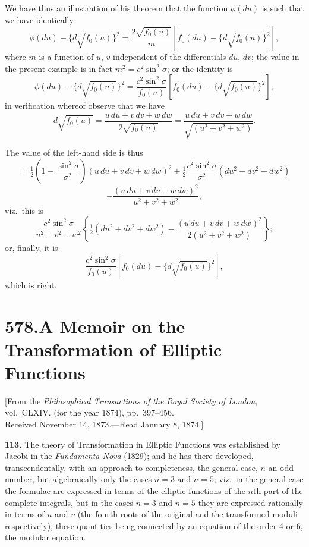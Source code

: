 \documentclass[11pt,a4paper]{book}
\begin{document}
We have thus an illustration of his theorem that the function $\phi(du)$ is such that we have identically
\[
\phi(du) - \{d\sqrt{f_0(u)}\}^2 = \frac{2\sqrt{f_0(u)}}{m}\left[f_0(du) - \{d\sqrt{f_0(u)}\}^2\right],
\]
where $m$ is a function of $u$, $v$ independent of the differentials $du$, $dv$; the value in the present example is in fact $m^2 = c^2\sin^2\sigma$; or the identity is
\[
\phi(du) - \{d\sqrt{f_0(u)}\}^2 = \frac{c^2\sin^2\sigma}{f_0(u)}\left[f_0(du) - \{d\sqrt{f_0(u)}\}^2\right],
\]
in verification whereof observe that we have
\[
d\sqrt{f_0(u)} = \frac{u\,du + v\,dv + w\,dw}{2\sqrt{f_0(u)}} = \frac{u\,du + v\,dv + w\,dw}{\sqrt{(u^2 + v^2 + w^2)}}.
\]

The value of the left-hand side is thus
\[
= \tfrac{1}{2}\left(1 - \frac{\sin^2\sigma}{\sigma^2}\right)(u\,du + v\,dv + w\,dw)^2 + \tfrac{1}{2}\frac{c^2\sin^2\sigma}{\sigma^2}(du^2 + dv^2 + dw^2)
\]
\[
- \frac{(u\,du + v\,dv + w\,dw)^2}{u^2 + v^2 + w^2},
\]
viz.\ this is
\[
\frac{c^2\sin^2\sigma}{u^2 + v^2 + w^2}\left\{\tfrac{1}{2}(du^2 + dv^2 + dw^2) - \frac{(u\,du + v\,dv + w\,dw)^2}{2(u^2 + v^2 + w^2)}\right\};
\]
or, finally, it is
\[
\frac{c^2\sin^2\sigma}{f_0(u)}\left[f_0(du) - \{d\sqrt{f_0(u)}\}^2\right],
\]
which is right.



\newpage
\section*{578.\quad A Memoir on the Transformation of Elliptic Functions}

\begin{flushright}
\small[From the \textit{Philosophical Transactions of the Royal Society of London},\\ vol.~CLXIV. (for the year 1874), pp.~397--456.\\ Received November 14, 1873.---Read January 8, 1874.]
\end{flushright}

\noindent\textbf{113.} The theory of Transformation in Elliptic Functions was established by Jacobi in the \textit{Fundamenta Nova} (1829); and he has there developed, transcendentally, with an approach to completeness, the general case, $n$ an odd number, but algebraically only the cases $n = 3$ and $n = 5$; viz.\ in the general case the formulae are expressed in terms of the elliptic functions of the $n$th part of the complete integrals, but in the cases $n = 3$ and $n = 5$ they are expressed rationally in terms of $u$ and $v$ (the fourth roots of the original and the transformed moduli respectively), these quantities being connected by an equation of the order 4 or 6, the modular equation.
\end{document}
